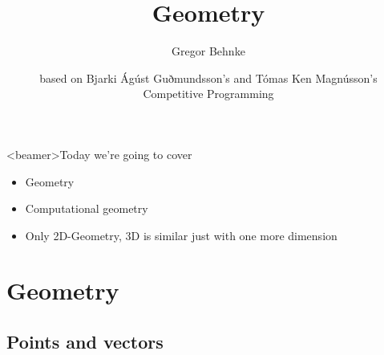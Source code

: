 \documentclass[12pt,t]{beamer}
\title{Geometry}
\author{Gregor Behnke}
\institute{Institute of Artificial Intelligence\\ Ulm University}
\date{\tiny based on Bjarki Ágúst Guðmundsson's and Tómas Ken Magnússon's\\Competitive Programming}
\newcommand{\bi}{\begin{itemize}}
\newcommand{\ei}{\end{itemize}}
\begin{document}
{
    \frame{
        \titlepage
    }
}


\begin{frame}<beamer>{Today we're going to cover}
    \vspace{40pt}
    \bi
      \item Geometry
      \item Computational geometry \pause
      \item Only 2D-Geometry, 3D is similar just with one more dimension
    \ei
\end{frame}

\section{Geometry}
\subsection{Points and vectors}
\end{document}

